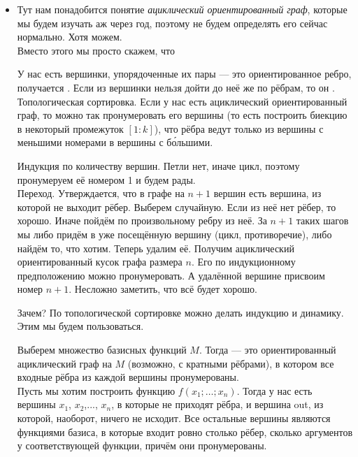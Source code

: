 \documentclass{article}
\begin{document}
    \begin{itemize}
        \item[]\mbox{}
        \begin{Comment}
            Тут нам понадобится понятие \textit{ациклический ориентированный граф}, которые мы будем изучать аж через год, поэтому не будем определять его сейчас нормально. Хотя можем.\\
            Вместо этого мы просто скажем, что
        \end{Comment}
        \dfn У нас есть вершинки, упорядоченные их пары --- это ориентированное ребро, получается . Если из вершинки нельзя дойти до неё же по рёбрам, то он .
        \thm Топологическая сортировка. Если у нас есть ациклический ориентированный граф, то можно так пронумеровать его вершины (то есть построить биекцию в некоторый промежуток $[1:k]$), что рёбра ведут только из вершины с меньшими номерами в вершины с б\'{о}льшими.
        \begin{Proof}
            Индукция по количеству вершин. Петли нет, иначе цикл, поэтому пронумеруем её номером 1 и будем рады.\\
            Переход. Утверждается, что в графе на $n+1$ вершин есть вершина, из которой не выходит рёбер. Выберем случайную. Если из неё нет рёбер, то хорошо. Иначе пойдём по произвольному ребру из неё. За $n+1$ таких шагов мы либо придём в уже посещённую вершину (цикл, противоречие), либо найдём то, что хотим. Теперь удалим её. Получим ациклический ориентированный кусок графа размера $n$. Его по индукционному предположению можно пронумеровать. А удалённой вершине присвоим номер $n+1$. Несложно заметить, что всё будет хорошо.
        \end{Proof}
        \begin{Comment}
            Зачем? По топологической сортировке можно делать индукцию и динамику. Этим мы будем пользоваться.
        \end{Comment}
        \dfn Выберем множество базисных функций $M$. Тогда  --- это ориентированный ациклический граф на $M$ (возможно, с кратными рёбрами), в котором все входные рёбра из каждой вершины пронумерованы.\\
        Пусть мы хотим построить функцию $f(x_1;\ldots;x_n)$. Тогда у нас есть вершины $x_1$, $x_2$,..., $x_n$, в которые не приходят рёбра, и вершина out, из которой, наоборот, ничего не исходит. Все остальные вершины являются функциями базиса, в которые входит ровно столько рёбер, сколько аргументов у соответствующей функции, причём они пронумерованы.

\end{itemize}
\end{document}

